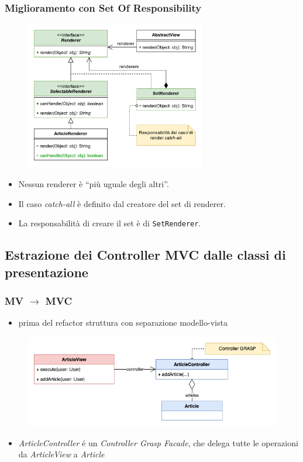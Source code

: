 \begin{frame}
    \frametitle{Miglioramento con Set Of Responsibility}

    \begin{figure}
        \includegraphics[width=0.7\textwidth]{img/setofresponsibility.png}
    \end{figure}
    \begin{itemize}
      \item Nessun renderer è ``più uguale degli altri''.
      \item Il caso \emph{catch-all} è definito dal creatore del set di renderer.
      \item La responsabilità di creare il set è di \texttt{SetRenderer}.
    \end{itemize}
\end{frame}


\subsection{Estrazione dei Controller MVC dalle classi di presentazione}
\begin{frame}
    \frametitle{MV $\to$ MVC}
    \begin{itemize}
        \item prima del refactor struttura con separazione modello-vista
    \end{itemize}
    \begin{figure}
        \includegraphics[width=1\textwidth]{img/modello-vista_before.png}
    \end{figure}
    \begin{itemize}
        \item \emph{ArticleController } é un \emph{Controller Grasp Facade}, che delega tutte le operazioni da \emph{ArticleView} a \emph{Article}
    \end{itemize}
\end{frame}

